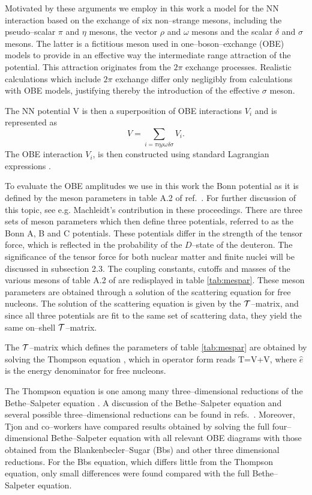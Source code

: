 Motivated by these arguments we employ in this work a model for the
NN interaction based on the exchange of six non--strange mesons, including
the pseudo--scalar $\pi$ and $\eta$ mesons, the vector $\rho$ and $\omega$
mesons and the scalar $\delta$ and $\sigma$ mesons. The latter is
a fictitious meson used in one--boson--exchange (OBE) models to provide in an
effective way the intermediate
range attraction of the potential. This attraction
originates from the $2\pi$ exchange processes.
Realistic calculations \cite{mac89,mhe87}
which include $2\pi$ exchange differ only negligibly from calculations
with OBE models, justifying thereby the introduction of the effective
$\sigma$ meson.

The NN potential V is then a superposition of OBE interactions $V_i$
and is represented as
\[
V=\sum_{i=\pi\eta\rho\omega\delta\sigma}V_i.
\]
The OBE interaction $V_i$, is then constructed using
standard Lagrangian expressions \cite{mhe87,iz80,bj76}.


To evaluate the OBE amplitudes we use in this work the
Bonn potential as it is defined by the meson parameters in table
A.2 of ref.\ \cite{mac89}. For further discussion of this topic, see
e.g. Machleidt's contribution in these proceedings.
There are three sets of meson parameters which then define three potentials,
referred to as the Bonn A, B and C potentials. These potentials differ
in the strength of the tensor force, which is reflected in the
probability of the $D$--state of the deuteron. The significance of the
tensor force for both nuclear matter and finite nuclei will be discussed
in subsection 2.3.
The coupling
constants, cutoffs and masses  of the various mesons of table A.2 of \cite{mac89} are
redisplayed in table  \ref{tab:mespar}. These meson
parameters are obtained through a solution of the scattering equation
for free nucleons. The solution of the scattering equation is given by the
${\cal T}$--matrix, and since all three potentials are fit to the same set of
scattering data, they yield the same on--shell ${\cal T}$--matrix.


The ${\cal T}$--matrix which defines the parameters of table
\ref{tab:mespar} are obtained
by solving the Thompson equation \cite{thomp70}, which in 
operator form reads
\be
{\cal T}=V+V,
\label{eq:thomp}
\ee
where $\hat{e}$ is the energy denominator for free nucleons.


The Thompson equation is one among many three--dimensional reductions
of the Bethe--Salpeter equation \cite{bd64}.
A discussion of the Bethe--Salpeter
equation and several possible three--dimensional reductions can be found
in refs.\ \cite{bj76,wj73}. Moreover, Tjon and co--workers \cite{tjon81}
have compared results obtained by solving the full four--dimensional
Bethe--Salpeter equation with all relevant OBE diagrams with those
obtained from the Blankenbecler--Sugar (Bbs) \cite{bbs68} and other three
dimensional reductions. For the Bbs equation, which differs little from the
Thompson equation, only small differences were found compared with the
full Bethe--Salpeter equation.

